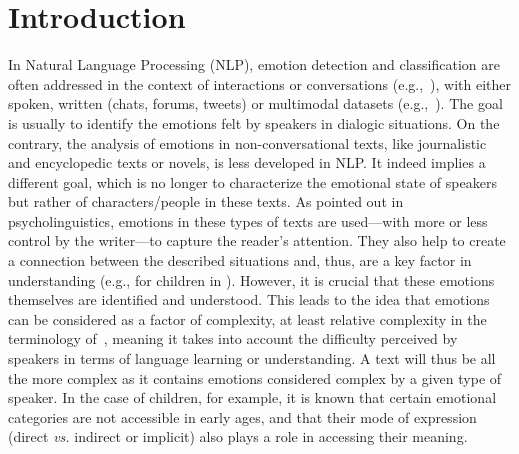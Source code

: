 \section{Introduction}
In Natural Language Processing (NLP), emotion detection and classification are often addressed in the context of interactions or conversations (e.g.,~\citep{poria2019emotion}), with either spoken, written (chats, forums, tweets) or multimodal datasets (e.g.,~\citep{busso2008iemocap,poria2018meld,chen2018emotionlines}). The goal is usually to identify the emotions felt by speakers in dialogic situations.
On the contrary, the analysis of emotions in non-conversational texts, like journalistic and encyclopedic texts or novels, is less developed in NLP. It indeed implies a different goal, which is no longer to characterize the emotional state of speakers but rather of characters/people in these texts. As pointed out in psycholinguistics, emotions in these types of texts are used---with more or less control by the writer---to capture the reader's attention. They also help to create a connection between the described situations and, thus, are a key factor in understanding (e.g., for children in \citealp{davidson_childrens_2001}). However, it is crucial that these emotions themselves are identified and understood. This leads to the idea that emotions can be considered as a factor of complexity, at least relative complexity in the terminology of~\citet{ehret2023measuring}, meaning it takes into account the difficulty perceived by speakers in terms of language learning or understanding. A text will thus be all the more complex as it contains emotions considered complex by a given type of speaker. In the case of children, for example, it is known that certain emotional categories are not accessible in early ages, and that their mode of expression (direct \textit{vs.} indirect or implicit) also plays a role in accessing their meaning.


